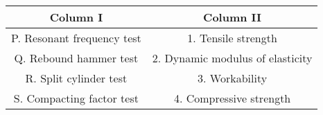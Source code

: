 \begin{tabular}{|c|c|}
    \hline
    Column I & Column II\\
    \hline
    P. Resonant frequency test & 1. Tensile strength \\
    \hline
    Q. Rebound hammer test & 2. Dynamic modulus of elasticity \\
    \hline
    R. Split cylinder test & 3. Workability \\
    \hline
    S. Compacting factor test & 4. Compressive strength\\
    \hline
\end{tabular}